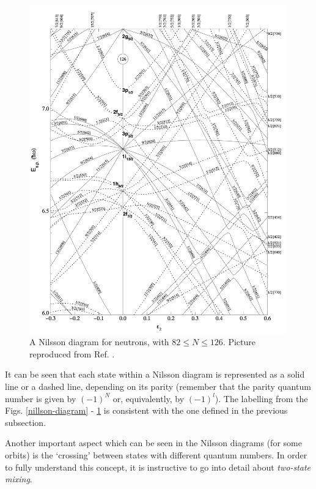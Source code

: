 \begin{figure}
    \centering
    \includegraphics[width=0.99\textwidth]{Chapters/Figures/nillson_diagram_2.png}
    \caption{A Nilsson diagram for neutrons, with $82\leq N\leq126$. %
    Picture reproduced from Ref. \cite{ragnarsson2005shapes}.}
    \label{nillson-diagram-2}
\end{figure}

It can be seen that each state within a Nilsson diagram is represented as a solid line or a dashed line, depending on its parity (remember that the parity quantum number is given by $(-1)^N$ or, equivalently, by $(-1)^l$). The labelling from the Figs. \ref{nillson-diagram} - \ref{nillson-diagram-2} is consistent with the one defined in the previous subsection.

Another important aspect which can be seen in the Nilsson diagrams (for some orbits) is the `crossing' between states with different quantum numbers. In order to fully understand this concept, it is instructive to go into detail about \emph{two-state mixing}.

